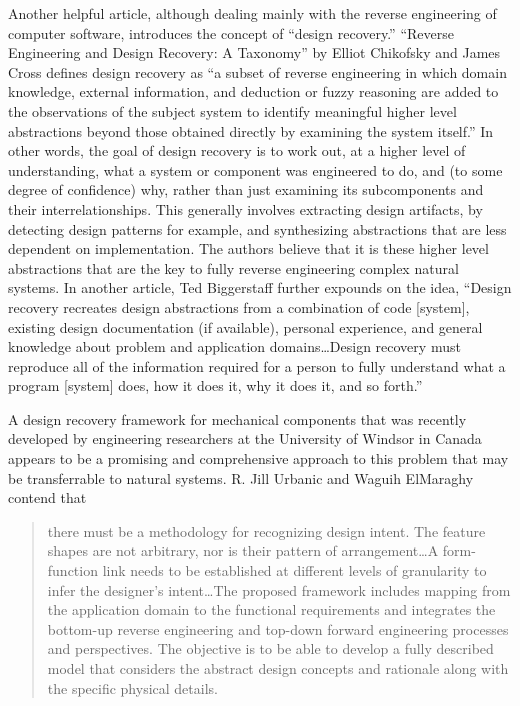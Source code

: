 Another helpful article, although dealing mainly with the reverse
engineering of computer software, introduces the concept of ``design
recovery.'' ``Reverse Engineering and Design Recovery: A Taxonomy'' by
Elliot Chikofsky and James Cross defines design recovery as ``a subset
of reverse engineering in which domain knowledge, external information,
and deduction or fuzzy reasoning are added to the observations of the
subject system to identify meaningful higher level abstractions beyond
those obtained directly by examining the system
itself.''\citep[][p.~15]{chikofskycross1990}
In other words, the goal of design
recovery is to work out, at a higher level of understanding, what a
system or component was engineered to do, and (to some degree of
confidence) why, rather than just examining its subcomponents and their
interrelationships. This generally involves extracting design
artifacts, by detecting design patterns for example, and synthesizing
abstractions that are less dependent on implementation. The authors
believe that it is these higher level abstractions that are the key to
fully reverse engineering complex natural systems. In another article,
Ted Biggerstaff further expounds on the idea, ``Design recovery
recreates design abstractions from a combination of code [system],
existing design documentation (if available), personal experience, and
general knowledge about problem and application domains{\ldots}Design recovery
must reproduce all of the information required for a person to fully
understand what a program [system] does, how it does it, why it does
it, and so forth.''\citep[][p.~36]{biggerstaff1989}

A design recovery framework for mechanical components that was recently
developed by engineering researchers at the University of Windsor in
Canada appears to be a promising and comprehensive approach to this
problem that may be transferrable to natural systems. R. Jill Urbanic
and Waguih ElMaraghy contend that 

\begin{quote}
there must be a methodology for
recognizing design intent. The feature shapes are not arbitrary, nor is
their pattern of arrangement{\ldots}A form-function link needs to be
established at different levels of granularity to infer the designer’s
intent{\ldots}The proposed framework includes mapping from the application
domain to the functional requirements and integrates the bottom-up
reverse engineering and top-down forward engineering processes and
perspectives. The objective is to be able to develop a fully described
model that considers the abstract design concepts and rationale along
with the specific physical details. \citep{urbanicelmaraghy2009}
\end{quote}

